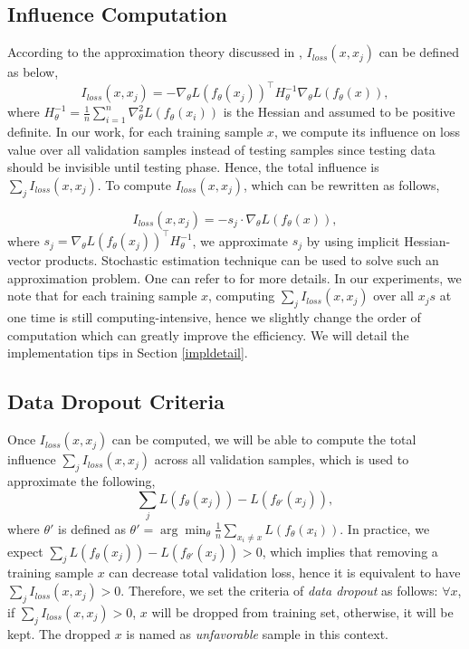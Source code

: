 \documentclass[10pt, conference, letterpaper]{IEEEtran}
\begin{document}
\subsection{Influence Computation}
\label{computeInf}
According to the approximation theory discussed in \cite{koh2017understanding}, $I_{loss}(x, x_{j})$ can be defined as below,
\begin{equation}
  I_{loss}(x, x_{j})=-\nabla_\theta L(f_{\theta}(x_{j}))^\top H_{\theta}^{-1} \nabla_\theta L(f_{\theta}(x)),
\end{equation}
where $H_{\theta}^{-1}=\frac{1}{n} \sum_{i=1}^n \nabla^2_\theta L(f_{\theta}(x_{i}))$ is the Hessian %
and assumed to be positive definite. In our work, for each training sample $x$, we compute its influence on loss value over all validation samples instead of testing samples since testing data should be invisible until testing phase. Hence, the total influence is $\sum_{j}I_{loss}(x, x_{j})$. 
To compute $I_{loss}(x, x_{j})$, which can be rewritten as follows,

\begin{equation}
  I_{loss}(x, x_{j})=-s_{j}\cdot \nabla_\theta L(f_{\theta}(x)),
\end{equation}
where $s_{j}=\nabla_\theta L(f_{\theta}(x_{j}))^\top H_{\theta}^{-1}$, we approximate $s_{j}$ by using implicit Hessian-vector products. Stochastic estimation technique can be used to solve such an approximation problem. One can refer to \cite{koh2017understanding} for more details. In our experiments, we note that for each training sample $x$, computing $\sum_{j}I_{loss}(x, x_{j})$ over all $x_{j}s$ at one time is still computing-intensive, hence we slightly change the order of computation which can greatly improve the efficiency. We will detail the implementation tips in Section \ref{impldetail}.

\subsection{Data Dropout Criteria}
\label{criteria}
Once $I_{loss}(x, x_{j})$ can be computed, we will be able to compute the total influence $\sum_{j}I_{loss}(x, x_{j})$ across all validation samples, which is used to approximate the following,
\begin{equation}
  \sum_{j} L(f_{\theta}(x_{j}))-L(f_{\theta'}(x_{j})), 
\end{equation}
where ${\theta'}$ is defined as $\theta' = \arg\min_{\theta} \frac{1}{n} \sum_{x_{i}\neq{x}} L(f_{\theta}(x_{i}))$.
In practice, we expect $\sum_{j} L(f_{\theta}(x_{j}))-L(f_{\theta'}(x_{j}))>0$, which implies that removing a training sample $x$ can decrease total validation loss, hence it is equivalent to have $\sum_{j}I_{loss}(x, x_{j})>0$. Therefore, we set the criteria of \emph{data dropout} as follows:
$\forall{x}$, if $\sum_{j}I_{loss}(x, x_{j})>0$, $x$ will be dropped from training set, otherwise, it will be kept. The dropped $x$ is named as \emph{unfavorable} sample in this context.
\end{document}

